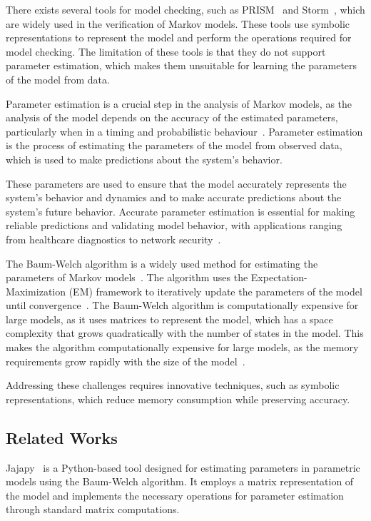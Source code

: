 There exists several tools for model checking, such as PRISM~\cite{kwiatkowska2011prism} and Storm~\cite{hensel2021probabilistic}, which are widely used in the verification of Markov models.
These tools use symbolic representations to represent the model and perform the operations required for model checking.
The limitation of these tools is that they do not support parameter estimation, which makes them unsuitable for learning the parameters of the model from data.

Parameter estimation is a crucial step in the analysis of Markov models, as the analysis of the model depends on the accuracy of the estimated parameters, particularly when in a timing and probabilistic behaviour~\cite{bacci2023mm}.
Parameter estimation is the process of estimating the parameters of the model from observed data, which is used to make predictions about the system's behavior.

These parameters are used to ensure that the model accurately represents the system's behavior and dynamics and to make accurate predictions about the system's future behavior.
Accurate parameter estimation is essential for making reliable predictions and validating model behavior, with applications ranging from healthcare diagnostics to network security~\cite{bacci2023mm}.

The Baum-Welch algorithm is a widely used method for estimating the parameters of Markov models~\cite{kenny2014deep}.
The algorithm uses the Expectation-Maximization (EM) framework to iteratively update the parameters of the model until convergence~\cite{levinson1983introduction}.
The Baum-Welch algorithm is computationally expensive for large models, as it uses matrices to represent the model, which has a space complexity that grows quadratically with the number of states in the model.
This makes the algorithm computationally expensive for large models, as the memory requirements grow rapidly with the size of the model~\cite{davis2004comparing}.

Addressing these challenges requires innovative techniques, such as symbolic representations, which reduce memory consumption while preserving accuracy.

\subsection{Related Works}\label{subsec:related-works}
Jajapy~\cite{reynouard2023jajapy} is a Python-based tool designed for estimating parameters in parametric models using the Baum-Welch algorithm.
It employs a matrix representation of the model and implements the necessary operations for parameter estimation through standard matrix computations.


